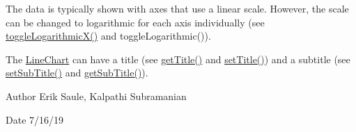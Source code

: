 The data is typically shown with axes that use a linear scale. However, the scale can be changed to logarithmic for each axis individually (see \mbox{\hyperlink{classbridges_1_1datastructure_1_1_line_chart_a4e2aa224d793793faa0c5a6edb729646}{toggle\+Logarithmic\+X()}} and toggle\+Logarithmic()).

The \mbox{\hyperlink{classbridges_1_1datastructure_1_1_line_chart}{Line\+Chart}} can have a title (see \mbox{\hyperlink{classbridges_1_1datastructure_1_1_line_chart_aa38d6cf9657d2757a98b657f079ae2bc}{get\+Title()}} and \mbox{\hyperlink{classbridges_1_1datastructure_1_1_line_chart_ac42cf1e6348ce8ab0c3593a496a3539c}{set\+Title()}}) and a subtitle (see \mbox{\hyperlink{classbridges_1_1datastructure_1_1_line_chart_a578c2590cb6baa8ef40ba1251bd1279e}{set\+Sub\+Title()}} and \mbox{\hyperlink{classbridges_1_1datastructure_1_1_line_chart_a07a4424d4bbc1cdd15cef3e2c0f0c075}{get\+Sub\+Title()}}).

\begin{DoxyAuthor}{Author}
Erik Saule, Kalpathi Subramanian
\end{DoxyAuthor}
\begin{DoxyDate}{Date}
7/16/19 
\end{DoxyDate}
